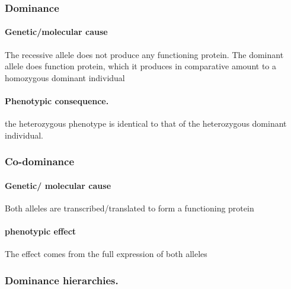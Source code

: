 \documentclass[]{article}
\let\oldparagraph\paragraph
\renewcommand{\paragraph}[1]{\oldparagraph{#1}\mbox{}}
\begin{document}
\hypertarget{dominance}{%
\subsubsection{Dominance}\label{dominance}}

\hypertarget{geneticmolecular-cause}{%
\paragraph{Genetic/molecular cause}\label{geneticmolecular-cause}}

The recessive allele does not produce any functioning protein. The
dominant allele does function protein, which it produces in comparative
amount to a homozygous dominant individual

\hypertarget{phenotypic-consequence.}{%
\paragraph{Phenotypic consequence.}\label{phenotypic-consequence.}}

the heterozygous phenotype is identical to that of the heterozygous
dominant individual.

\hypertarget{co-dominance}{%
\subsubsection{Co-dominance}\label{co-dominance}}

\hypertarget{genetic-molecular-cause-1}{%
\paragraph{Genetic/ molecular cause}\label{genetic-molecular-cause-1}}

Both alleles are transcribed/translated to form a functioning protein

\hypertarget{phenotypic-effect-1}{%
\paragraph{phenotypic effect}\label{phenotypic-effect-1}}

The effect comes from the full expression of both alleles

\hypertarget{dominance-hierarchies.}{%
\subsubsection{Dominance hierarchies.}\label{dominance-hierarchies.}}
\end{document}
